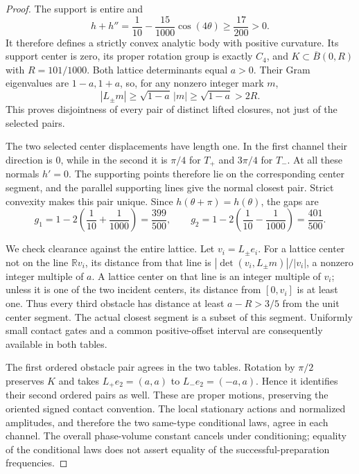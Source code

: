 \begin{proof}
The support is entire and
\begin{equation}\label{eq:v50-convexity}
 h+h''=\frac1{10}-\frac{15}{1000}\cos(4\theta)
                       \ge\frac{17}{200}>0.
\end{equation}
It therefore defines a strictly convex analytic body with positive
curvature.  Its support center is zero, its proper rotation group is
exactly $C_4$, and
$K\subset\overline B(0,R)$ with $R=101/1000$.
Both lattice determinants equal $a>0$.  Their Gram eigenvalues are
$1-a,1+a$, so, for any nonzero integer mark $m$,
\begin{equation}\label{eq:v50-separation}
 |L_\pm m|\ge\sqrt{1-a}\,|m|\ge\sqrt{1-a}>2R.
\end{equation}
This proves disjointness of every pair of distinct lifted closures,
not just of the selected pairs.

The two selected center displacements have length one.  In the first
channel their direction is $0$, while in the second it is $\pi/4$
for $T_+$ and $3\pi/4$ for $T_-$.  At all these normals $h'=0$.
The supporting points therefore lie on the corresponding center
segment, and the parallel supporting lines give the normal closest
pair.  Strict convexity makes this pair unique.  Since
$h(\theta+\pi)=h(\theta)$, the gaps are
\begin{equation}\label{eq:v50-two-gaps}
 g_1=1-2\left(\frac1{10}+\frac1{1000}\right)=\frac{399}{500},
 \qquad
 g_2=1-2\left(\frac1{10}-\frac1{1000}\right)=\frac{401}{500}.
\end{equation}

We check clearance against the entire lattice.  Let $v_i=L_\pm e_i$.
For a lattice center not on the line $\mathbb Rv_i$, its distance
from that line is
$|\det(v_i,L_\pm m)|/|v_i|$, a nonzero integer multiple of $a$.
A lattice center on that line is an integer multiple of $v_i$;
unless it is one of the two incident centers, its distance from
$[0,v_i]$ is at least one.  Thus every third obstacle has distance at
least $a-R>3/5$ from the unit center segment.  The actual closest
segment is a subset of this segment.  Uniformly small contact gates
and a common positive-offset interval are consequently available in
both tables.

The first ordered obstacle pair agrees in the two tables.  Rotation
by $\pi/2$ preserves $K$ and takes $L_+e_2=(a,a)$ to
$L_-e_2=(-a,a)$.  Hence it identifies their second ordered pairs as
well.  These are proper motions, preserving the oriented signed
contact convention.  The local stationary actions and normalized
amplitudes, and therefore the two same-type conditional laws, agree
in each channel.  The overall phase-volume constant cancels under
conditioning; equality of the conditional laws does not assert equality
of the successful-preparation frequencies.


\end{proof}
